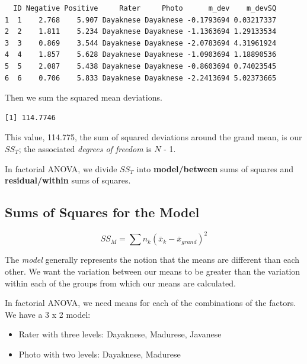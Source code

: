 \documentclass[
  11pt,
]{book}
\newenvironment{Shaded}{\begin{snugshade}}{\end{snugshade}}
\newcommand{\FunctionTok}[1]{\textcolor[rgb]{0.27,0.27,0.27}{\textbf{#1}}}
\newcommand{\NormalTok}[1]{#1}
\newcommand{\SpecialCharTok}[1]{\textcolor[rgb]{0.43,0.43,0.43}{\textbf{#1}}}
\providecommand{\tightlist}{%
  \setlength{\itemsep}{0pt}\setlength{\parskip}{0pt}}
\begin{document}
\begin{verbatim}
  ID Negative Positive     Rater     Photo      m_dev    m_devSQ
1  1    2.768    5.907 Dayaknese Dayaknese -0.1793694 0.03217337
2  2    1.811    5.234 Dayaknese Dayaknese -1.1363694 1.29133534
3  3    0.869    3.544 Dayaknese Dayaknese -2.0783694 4.31961924
4  4    1.857    5.628 Dayaknese Dayaknese -1.0903694 1.18890536
5  5    2.087    5.438 Dayaknese Dayaknese -0.8603694 0.74023545
6  6    0.706    5.833 Dayaknese Dayaknese -2.2413694 5.02373665
\end{verbatim}

Then we sum the squared mean deviations.

\begin{Shaded}
\end{Shaded}

\begin{verbatim}
[1] 114.7746
\end{verbatim}

This value, 114.775, the sum of squared deviations around the grand mean, is our \(SS_T\); the associated \emph{degrees of freedom} is \(N\) - 1.

In factorial ANOVA, we divide \(SS_T\) into \textbf{model/between} sums of squares and \textbf{residual/within} sums of squares.

\hypertarget{sums-of-squares-for-the-model}{%
\subsection{Sums of Squares for the Model}\label{sums-of-squares-for-the-model}}

\[SS_{M}= \sum n_{k}(\bar{x}_{k}-\bar{x}_{grand})^{2}\]

The \emph{model} generally represents the notion that the means are different than each other. We want the variation between our means to be greater than the variation within each of the groups from which our means are calculated.

In factorial ANOVA, we need means for each of the combinations of the factors. We have a 3 x 2 model:

\begin{itemize}
\tightlist
\item
  Rater with three levels: Dayaknese, Madurese, Javanese
\item
  Photo with two levels: Dayaknese, Madurese
\end{itemize}
\end{document}
